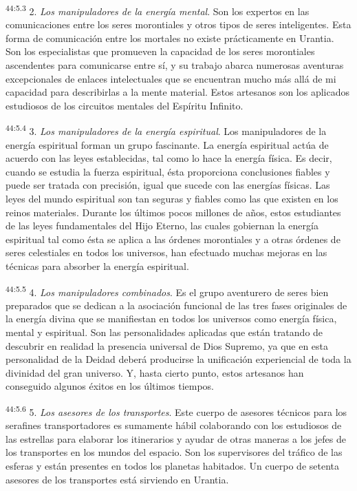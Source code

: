 \par
\textsuperscript{44:5.3} 2. \textit{Los manipuladores de la energía mental}. Son los expertos en las comunicaciones entre los seres morontiales y otros tipos de seres inteligentes. Esta forma de comunicación entre los mortales no existe prácticamente en Urantia. Son los especialistas que promueven la capacidad de los seres morontiales ascendentes para comunicarse entre sí, y su trabajo abarca numerosas aventuras excepcionales de enlaces intelectuales que se encuentran mucho más allá de mi capacidad para describirlas a la mente material. Estos artesanos son los aplicados estudiosos de los circuitos mentales del Espíritu Infinito.

\par
\textsuperscript{44:5.4} 3. \textit{Los manipuladores de la energía espiritual}. Los manipuladores de la energía espiritual forman un grupo fascinante. La energía espiritual actúa de acuerdo con las leyes establecidas, tal como lo hace la energía física. Es decir, cuando se estudia la fuerza espiritual, ésta proporciona conclusiones fiables y puede ser tratada con precisión, igual que sucede con las energías físicas. Las leyes del mundo espiritual son tan seguras y fiables como las que existen en los reinos materiales. Durante los últimos pocos millones de años, estos estudiantes de las leyes fundamentales del Hijo Eterno, las cuales gobiernan la energía espiritual tal como ésta se aplica a las órdenes morontiales y a otras órdenes de seres celestiales en todos los universos, han efectuado muchas mejoras en las técnicas para absorber la energía espiritual.

\par
\textsuperscript{44:5.5} 4. \textit{Los manipuladores combinados}. Es el grupo aventurero de seres bien preparados que se dedican a la asociación funcional de las tres fases originales de la energía divina que se manifiestan en todos los universos como energía física, mental y espiritual. Son las personalidades aplicadas que están tratando de descubrir en realidad la presencia universal de Dios Supremo, ya que en esta personalidad de la Deidad deberá producirse la unificación experiencial de toda la divinidad del gran universo. Y, hasta cierto punto, estos artesanos han conseguido algunos éxitos en los últimos tiempos.

\par
\textsuperscript{44:5.6} 5. \textit{Los asesores de los transportes}. Este cuerpo de asesores técnicos para los serafines transportadores es sumamente hábil colaborando con los estudiosos de las estrellas para elaborar los itinerarios y ayudar de otras maneras a los jefes de los transportes en los mundos del espacio. Son los supervisores del tráfico de las esferas y están presentes en todos los planetas habitados. Un cuerpo de setenta asesores de los transportes está sirviendo en Urantia.

